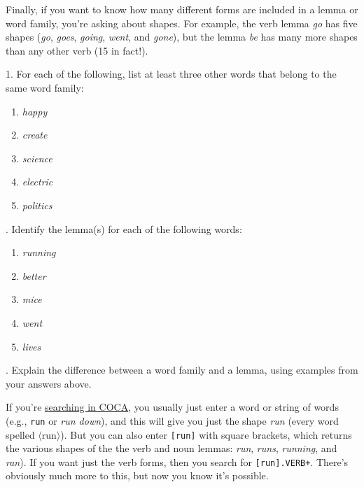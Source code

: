 Finally, if you want to know how many different forms are included in a lemma or word family, you're asking about shapes. For example, the verb lemma \textit{go} has five shapes (\textit{go}, \textit{goes}, \textit{going}, \textit{went}, and \textit{gone}), but the lemma \textit{be} has many more shapes than any other verb (15 in fact!).

\begin{tcolorbox}[title=Exercise: Word Families and Lemmas, colback=white, colframe=blue!75!black, fonttitle=\bfseries]
1. For each of the following, list at least three other words that belong to the same word family:

\begin{enumerate}[nosep]
    \item \textit{happy}
    \item \textit{create}
    \item \textit{science}
    \item \textit{electric}
    \item \textit{politics}
\end{enumerate}
. Identify the lemma(s) for each of the following words:

\begin{enumerate}[nosep]
    \item \textit{running}
    \item \textit{better}
    \item \textit{mice}
    \item \textit{went}
    \item \textit{lives}
\end{enumerate}
. Explain the difference between a word family and a lemma, using examples from your answers above.
\end{tcolorbox}

\begin{tcolorbox}[title=Searching for shapes and lemmas]
    If you're \href{https://www.english-corpora.org/coca/}{searching in COCA}, you usually just enter a word or string of words (e.g., \texttt{run} or \textit{run down}), and this will give you just the shape \textit{run} (every word spelled $\langle$run$\rangle$). But you can also enter \texttt{[run]} with square brackets, which returns the various shapes of the the verb and noun lemmas: \textit{run}, \textit{runs}, \textit{running}, and \textit{ran}). If you want just the verb forms, then you search for \texttt{[run].VERB+}. There's obviously much more to this, but now you know it's possible.
\end{tcolorbox}

